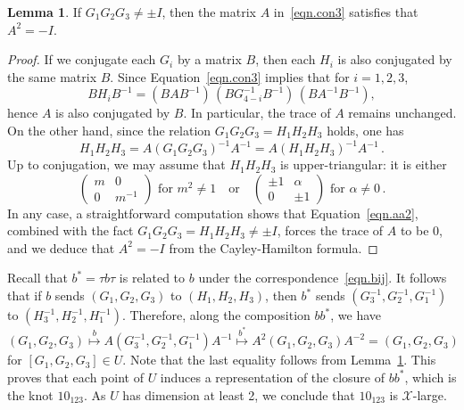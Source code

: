 \documentclass[12pt,reqno]{amsart}
\theoremstyle{definition}
\newtheorem{lemma}[theorem]{Lemma}
\def\calX{\mathcal X}
\begin{document}
\begin{lemma} 
\label{lem.AA}
If $G_1G_2G_3 \neq \pm I$, then the matrix $A$ in~\eqref{eqn.con3} satisfies that $A^2 = -I$.
\end{lemma}
\begin{proof}
If we conjugate each $G_i$ by a matrix $B$, then each $H_i$ is also conjugated by the same matrix $B$. Since Equation~\eqref{eqn.con3} implies that for $i=1,2,3$,
\begin{equation}
    BH_iB^{-1} = (BAB^{-1}) \, (BG_{4-i}^{-1}B^{-1}) \, (BA^{-1}B^{-1}),
\end{equation}
hence $A$ is also conjugated by $B$. In particular, the trace of $A$ remains unchanged.
On the other hand, since the relation $G_1G_2G_3 = H_1H_2H_3$ holds, one has
\begin{equation}
\label{eqn.aa2}
    H_1 H_2 H_3 = A (G_1 G_2G_3)^{-1} A^{-1} = A(H_1 H_2 H_3)^{-1} A^{-1} \,.
\end{equation}
Up to conjugation, we may assume that $H_1H_2H_3$ is upper-triangular: it is either
$$
\begin{pmatrix}
    m & 0 \\ 0 & m^{-1} 
\end{pmatrix}
\text{ for } m^2 \neq 1
\quad \text{or} \quad
\begin{pmatrix}
    \pm 1 & \alpha \\ 0 & \pm1 
\end{pmatrix}
\text{ for } \alpha \neq 0 \,.
$$
In any case, a straightforward computation shows that Equation~\eqref{eqn.aa2}, combined with the fact $G_1 G_2 G_3 = H_1 H_2 H_3 \neq \pm I$, forces the trace of $A$ to be 0, and we deduce that $A^2=-I$ from the Cayley-Hamilton formula.
\end{proof}


Recall that $b^\ast=\tau b \tau$ is related to $b$ under the correspondence~\eqref{eqn.bij}. It follows that if $b$ sends $(G_1,G_2,G_3)$ to $(H_1,H_2,H_3)$, then $b^\ast$ sends $(G_3^{-1},G_2^{-1},G_1^{-1})$ to $(H_3^{-1},H_2^{-1},H_1^{-1})$. Therefore, along the composition $b b^\ast$, we have
$$
(G_1,G_2,G_3) \overset{b}{\longmapsto}A(G_3^{-1},G_2^{-1},G_1^{-1})A^{-1}
\overset{b^\ast}{\longmapsto} A^2(G_1,G_2,G_3)A^{-2} = (G_1,G_2,G_3)
$$
for $[G_1,G_2,G_3] \in U$. Note that the last equality follows from Lemma~\ref{lem.AA}. This proves that each point of $U$ induces a representation of the closure of $bb^\ast$, which is the knot $10_{123}$. As $U$ has dimension at least 2, we conclude that $10_{123}$ is $\calX$-large.
\end{document}
